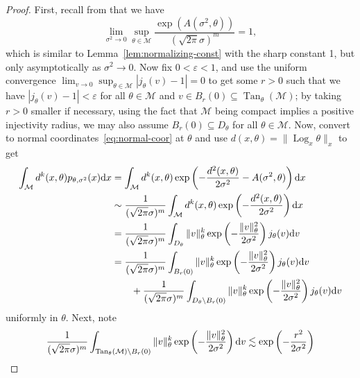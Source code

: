 \documentclass[preprint]{imsart}
\theoremstyle{plain}
\theoremstyle{definition}
\newcommand{\Mcal}{\mathcal{M}}
\newcommand{\diff}{\textnormal{d}}
\DeclareMathOperator{\Tan}{Tan}
\DeclareMathOperator{\Log}{Log}
\begin{document}
\begin{appendix}
\begin{proof}
    First, recall from \cite[Theorem~5]{PennecRiemNorm} that we have
    \begin{equation}\label{eqn:eA-limit}
        \lim_{\sigma^2\to 0}\sup_{\theta\in\Mcal}\frac{\exp(A(\sigma^2,\theta))}{(\sqrt{2\pi}\sigma)^m} = 1,
    \end{equation}
    which is similar to Lemma~\ref{lem:normalizing-const} with the sharp constant 1, but only asymptotically as $\sigma^2\to 0$.
    Now fix $0<\varepsilon<1$, and use the uniform convergence $\lim_{v\to 0}\sup_{\theta\in \Mcal}|j_{\theta}(v)-1|= 0$ to get some $r>0$ such that we have $|j_\theta(v)-1| < \varepsilon$ for all $\theta\in\Mcal$ and $v\in B_r(0)\subseteq\Tan_\theta(\Mcal)$; by taking $r>0$ smaller if necessary, using the fact that $\Mcal$ being compact implies a positive injectivity radius, we may also assume $B_r(0)\subseteq D_{\theta}$ for all $\theta\in\Mcal$.
    Now, convert to normal coordinates~\eqref{eq:normal-coor} at $\theta$ and use $d(x,\theta)=\|\Log_x\theta\|_x$ to get
    \begin{equation}\label{eqn:integral-asymp}
        \begin{split}
        \int_{\Mcal}d^k(x,\theta)p_{\theta,\sigma^2}(x)\diff x &=\int_{\Mcal}d^k(x,\theta)\exp\left(-\frac{d^2(x,\theta)}{2\sigma^2}-A(\sigma^2,\theta)\right)\diff x\\
        &\sim\frac{1}{(\sqrt{2\pi}\sigma)^m}\int_{\Mcal}d^k(x,\theta)\exp\left(-\frac{d^2(x,\theta)}{2\sigma^2}\right)\diff x \\
        &=\frac{1}{(\sqrt{2\pi}\sigma)^m}\int_{D_{\theta}}\|v\|^k_{\theta}\exp\left(-\frac{\|v\|^2_{\theta}}{2\sigma^2}\right)j_{\theta}(v)\diff v \\
        &=\frac{1}{(\sqrt{2\pi}\sigma)^m}\int_{B_r(0)}\|v\|^k_{\theta}\exp\left(-\frac{\|v\|^2_{\theta}}{2\sigma^2}\right)j_{\theta}(v)\diff v \\
        &\qquad+\frac{1}{(\sqrt{2\pi}\sigma)^m}\int_{D_{\theta}\setminus B_r(0)}\|v\|^k_{\theta}\exp\left(-\frac{\|v\|^2_{\theta}}{2\sigma^2}\right)j_{\theta}(v)\diff v 
        \end{split}
    \end{equation}
    uniformly in $\theta$.
    Next, note
    \begin{equation*}
        \frac{1}{(\sqrt{2\pi}\sigma)^m}\int_{\Tan_{\theta}(\Mcal)\setminus B_r(0)}\|v\|^k_{\theta}\exp\left(-\frac{\|v\|^2_{\theta}}{2\sigma^2}\right)\diff v  \lesssim \exp\left(-\frac{r^2}{2\sigma^2}\right)
    \end{equation*}

\end{proof}
\end{appendix}
\end{document}
